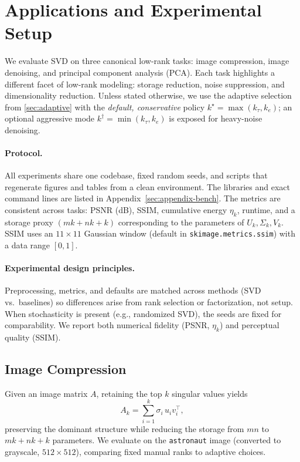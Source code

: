 \documentclass[11pt,a4paper]{article}
\begin{document}
\section{Applications and Experimental Setup}
\label{sec:applications}

We evaluate SVD on three canonical low-rank tasks: image compression, image denoising, and principal component analysis (PCA). 
Each task highlights a different facet of low-rank modeling: storage reduction, noise suppression, and dimensionality reduction. 
Unless stated otherwise, we use the adaptive selection from \cref{sec:adaptive} with the \emph{default, conservative} policy \(k^\star=\max(k_\tau,k_e)\); an optional aggressive mode \(k^\dagger=\min(k_\tau,k_e)\) is exposed for heavy-noise denoising.

\paragraph{Protocol.}
All experiments share one codebase, fixed random seeds, and scripts that regenerate figures and tables from a clean environment. 
The libraries and exact command lines are listed in Appendix~\ref{sec:appendix-bench}. 
The metrics are consistent across tasks: PSNR (dB), SSIM, cumulative energy \(\eta_k\), runtime, and a storage proxy \((mk+nk+k)\) corresponding to the parameters of \(U_k,\Sigma_k,V_k\).
SSIM uses an $11{\times}11$ Gaussian window (default in \texttt{skimage.metrics.ssim}) with a data range $[0,1]$.

\paragraph{Experimental design principles.}
Preprocessing, metrics, and defaults are matched across methods (SVD vs.\ baselines) so differences arise from rank selection or factorization, not setup. 
When stochasticity is present (e.g., randomized SVD), the seeds are fixed for comparability. 
We report both numerical fidelity (PSNR, \(\eta_k\)) and perceptual quality (SSIM).

\subsection{Image Compression}
\label{sec:compression}

Given an image matrix \(A\), retaining the top \(k\) singular values yields
\[
A_k = \sum_{i=1}^{k} \sigma_i\, u_i v_i^\top,
\]
preserving the dominant structure while reducing the storage from \(mn\) to \(mk{+}nk{+}k\) parameters. 
We evaluate on the \texttt{astronaut} image (converted to grayscale, \(512{\times}512\)), comparing fixed manual ranks to adaptive choices.
\end{document}
